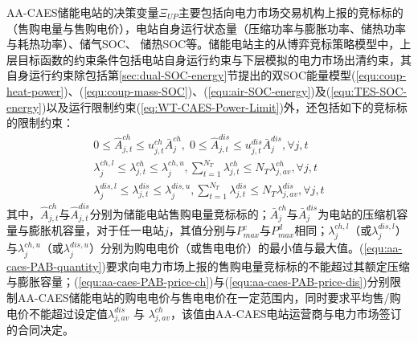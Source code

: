 AA-CAES储能电站的决策变量$\Xi _{UP}$主要包括向电力市场交易机构上报的竞标标的（售购电量与售购电价），电站自身运行状态量（压缩功率与膨胀功率、储热功率与耗热功率）、储气SOC、 储热SOC等。储能电站主的从博弈竞标策略模型中，上层目标函数的约束条件包括电站自身运行约束与下层模拟的电力市场出清约束，其自身运行约束除包括第\ref{sec:dual-SOC-energy}节提出的双SOC能量模型(\ref{equ:coup-heat-power})、(\ref{equ:coup-mass-SOC})、(\ref{equ:air-SOC-energy})及(\ref{equ:TES-SOC-energy})以及运行限制约束(\ref{eq:WT-CAES-Power-Limit})外，还包括如下的竞标标的限制约束：
\begin{subequations}
\label{equ:aa-caes-pab-bid-cons}
\begin{gather}
0 \le \hat A_{j,t}^{ch} \le u_{j,t}^{ch}\bar A_j^{ch},\;0 \le \hat A_{j,t}^{dis} \le u_{j,t}^{dis}\bar A_j^{dis}, \forall j,t \label{equ:aa-caes-PAB-quantity} \\
\lambda _{j}^{ch,l} \le \lambda _{j,t}^{ch} \le \lambda _{j}^{ch,u},\sum\nolimits_{t = 1}^{{N_T}} {\lambda _{j,t}^{ch}}  \le {N_T}\lambda _{j,av}^{ch} \label{equ:aa-caes-PAB-price-ch},\forall j,t \\
\lambda _{j}^{dis,l} \le \lambda _{j,t}^{dis} \le \lambda _{j}^{dis,u},\sum\nolimits_{t = 1}^{{N_T}} {\lambda _{j,t}^{dis}} \le {N_T}\lambda _{j,av}^{dis} \label{equ:aa-caes-PAB-price-dis}, \forall j,t
\end{gather}
\end{subequations}
其中，$\hat A_{j,t}^{ch}$与$\hat A_{j,t}^{dis}$分别为储能电站售购电量竞标标的；$\bar A_j^{ch}$与$\bar A_j^{dis}$为电站的压缩机容量与膨胀机容量，对于任一电站$j$，其值分别与$P_{max}^c$与$P_{max}^d$相同；$\lambda_j^{ch,l}$（或$\lambda_j^{dis,l}$）与$\lambda_j^{ch,u}$（或$\lambda_j^{dis,u}$）分别为购电电价（或售电电价）的最小值与最大值。(\ref{equ:aa-caes-PAB-quantity})要求向电力市场上报的售购电量竞标标的不能超过其额定压缩与膨胀容量；(\ref{equ:aa-caes-PAB-price-ch})与(\ref{equ:aa-caes-PAB-price-dis})分别限制AA-CAES储能电站的购电电价与售电电价在一定范围内，同时要求平均售/购电价不能超过设定值$\lambda _{j,av}^{dis}$ 与 $\lambda _{j,av}^{ch}$，该值由AA-CAES电站运营商与电力市场签订的合同决定。

